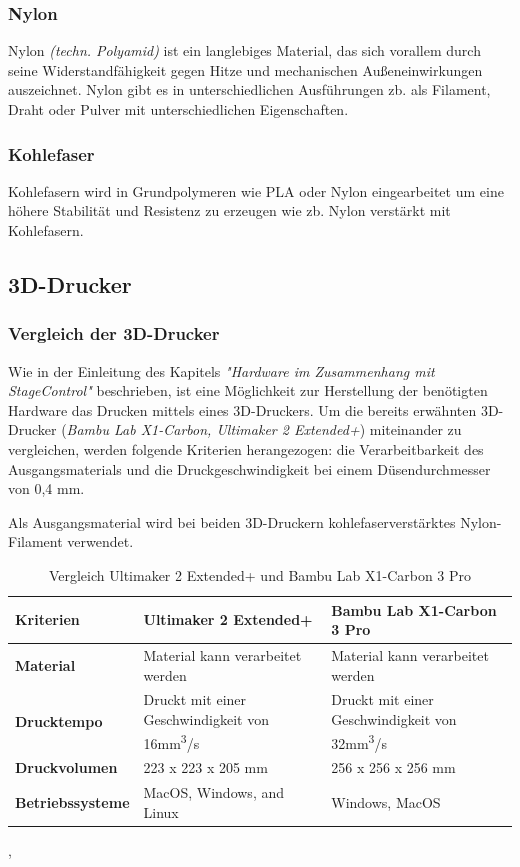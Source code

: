 \subsubsection{Nylon}
Nylon \emph{(techn. Polyamid)} ist ein langlebiges Material, das sich vorallem durch seine Widerstandfähigkeit gegen Hitze und mechanischen Außeneinwirkungen auszeichnet. Nylon gibt es in unterschiedlichen Ausführungen zb. als Filament, Draht oder Pulver mit unterschiedlichen Eigenschaften. \textcite{Nylon}
\subsubsection{Kohlefaser}
Kohlefasern wird in Grundpolymeren wie PLA oder Nylon eingearbeitet um eine höhere Stabilität und Resistenz zu erzeugen wie zb. Nylon verstärkt mit Kohlefasern.\\
 \textcite{Kohlefasern}


\subsection{3D-Drucker}

\subsubsection{Vergleich der 3D-Drucker}
Wie in der Einleitung des Kapitels \emph{"Hardware im Zusammenhang mit StageControl"} beschrieben, ist eine Möglichkeit zur Herstellung der benötigten Hardware das Drucken mittels eines 3D-Druckers. Um die bereits erwähnten 3D-Drucker (\emph{Bambu Lab X1-Carbon, Ultimaker 2 Extended+}) miteinander zu vergleichen, werden folgende Kriterien herangezogen: die Verarbeitbarkeit des Ausgangsmaterials und die Druckgeschwindigkeit bei einem Düsendurchmesser von 0,4 mm. 

Als Ausgangsmaterial wird bei beiden 3D-Druckern kohlefaserverstärktes Nylon-Filament verwendet.

\begin{table} [H]
	\begin{tabular}{ |p{2.7cm} |p{4.8cm}|p{4.8cm}| }
		\hline
		 \textbf{Kriterien} & \textbf{Ultimaker 2 Extended+}& \textbf{Bambu Lab X1-Carbon 3 Pro}\\
		\hline
		\textbf{Material} & Material kann verarbeitet werden & Material kann verarbeitet werden   \\ 
		\hline
		\textbf{Drucktempo} & Druckt mit einer Geschwindigkeit von 16mm\textsuperscript{3}/s &
		 Druckt mit einer Geschwindigkeit von 32mm\textsuperscript{3}/s   \\  
		\hline
		\textbf{Druckvolumen} & 223 x 223 x 205 mm & 256 x 256 x 256 mm \\
		\hline
		\textbf{Betriebssysteme} & MacOS, Windows, and Linux & Windows, MacOS \\
		\hline
	\end{tabular}
	\caption{Vergleich  Ultimaker 2 Extended+ und Bambu Lab X1-Carbon 3 Pro}
\end{table}
\textcite{BambuLabX1Carbon3DPrinterSpecifications}, \textcite{Ultimaker2ExtendedSpecification}

